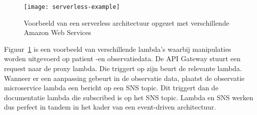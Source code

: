\begin{figure}[h]
\label{fig:serverless}
\caption{Voorbeeld van een serverless architectuur opgezet met verschillende Amazon Web Services}
\centering
\texttt{[image: serverless-example]}
\end{figure}

Figuur~\ref{fig:serverless} is een voorbeeld van verschillende lambda's waarbij manipulaties worden uitgevoerd op patient -en observatiedata. De API Gateway stuurt een request naar de proxy lambda. Die triggert op zijn beurt de relevante lambda. Wanneer er een aanpassing gebeurt in de observatie data, plaatst de observatie microservice lambda een bericht op een SNS topic. Dit triggert dan de documentatie lambda die subscribed is op het SNS topic. Lambda en SNS werken dus perfect in tandem in het kader van een event-driven architectuur. 